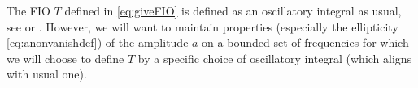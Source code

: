 \documentclass[
	fontsize=11pt, 
	twoside=false, 
	abstract=true, 
	a4paper,
]{scrartcl}
\newcommand{\sem}{\setminus\{0\}}
\newcommand{\RR}{\mathbb{R}}
\newcommand{\DD}{\mathscr{D}}
\newcommand{\dd}{\mathrm{d}}
\newcommand{\abs}[1]{\left\lvert#1\right\rvert}
\begin{document}
The FIO $T$ defined in \cref{eq:giveFIO} is defined as an oscillatory integral as usual, see \cite[Thm.~2.2.1]{zbMATH05817029} or \cite[\S~7.8]{hoermander1}. However, we will want to maintain properties (especially the ellipticity \cref{eq:anonvanishdef}) of the amplitude $a$ on a bounded set of frequencies for which we will choose to define $T$ by a specific choice of oscillatory integral (which aligns with usual one).

%
%
%
%
%
\end{document}
